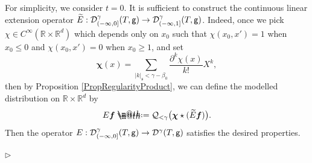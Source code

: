 \documentclass[10pt, reqno]{amsart}
\makeatletter
\numberwithin{subsection}{section}
\numberwithin{subsubsection}{subsection}
\numberwithin{equation}{section} %
\newenvironment{Dem}[1][\unskip]{%
    \begin{list}{\hspace{1.15cm}{\sf \textbf{{\small Proof #1 --}}}}{%
        \setlength{\topsep}{0pt}%
        \setlength{\leftmargin}{0pt}%
        \setlength{\rightmargin}{0pt}%
        \setlength{\listparindent}{0pt}%
        \setlength{\itemindent}{0pt}%
        \setlength{\parsep}{0pt}%
        \addtolength{\leftmargin}{0pt}%
        \addtolength{\rightmargin}{0pt}%
    } \item }{\hfill $\rhd$\end{list}\smallskip}
\theoremstyle{mystyle}
\theoremstyle{mystyle2}
\theoremstyle{mystyle3}
\newcommand{\bsf}{\boldsymbol{f}}
\newcommand{\mfs}{\mathfrak{s}}
\newcommand\bbR{\mathbb{R}}
\newcommand{\mcD}{\mathcal{D}}
\newcommand{\mcQ}{\mathcal{Q}}
\newcommand*{\defeq}{\mathrel{\rlap{%
                     \raisebox{0.3ex}{$\m@th\cdot$}}%
                     \raisebox{-0.3ex}{$\m@th\cdot$}}%
                     =}
\makeatother
\begin{document}
\medskip

\begin{Dem}
For simplicity, we consider $t=0$. It is sufficient to construct the continuous linear extension operator $\widetilde{E}:\mcD_{(-\infty,0]}^\gamma(T,{\sf g})\to \mcD_{(-\infty,1]}^\gamma(T,{\sf g})$. Indeed, once we pick $\chi\in C^\infty(\bbR\times\bbR^d)$ which depends only on $x_0$ such that $\chi(x_0,x')=1$ when $x_0\le0$ and $\chi(x_0,x')=0$ when $x_0\ge1$, and set
$$
\boldsymbol{\chi}(x)=\sum_{|k|_\mfs<\gamma-\beta_0}\frac{\partial^k\chi(x)}{k!}X^k,
$$
then by Proposition \ref{PropRegularityProduct}, we can define the modelled distribution on $\bbR\times\bbR^d$ by
$$
E\bsf\defeq\mcQ_{<\gamma}\big(\boldsymbol{\chi}\star(\widetilde{E}\bsf)\big).
$$
Then the operator $E:\mcD_{(-\infty,0]}^\gamma(T,{\sf g})\to \mcD^\gamma(T,{\sf g})$ satisfies the desired properties.


\end{Dem}
\end{document}
